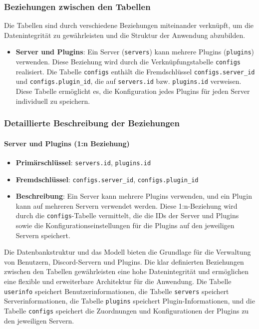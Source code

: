 \subsubsection{Beziehungen zwischen den Tabellen}\label{beziehungen-zwischen-den-tabellen}

Die Tabellen sind durch verschiedene Beziehungen miteinander verknüpft, um die Datenintegrität zu gewährleisten und die Struktur der Anwendung abzubilden.

\begin{itemize}
\item
  \textbf{Server und Plugins}: Ein Server (\texttt{servers}) kann mehrere Plugins (\texttt{plugins}) verwenden. Diese Beziehung wird durch die Verknüpfungstabelle \texttt{configs} realisiert. Die Tabelle \texttt{configs} enthält die Fremdschlüssel \texttt{configs.server\_id} und \texttt{configs.plugin\_id}, die auf \texttt{servers.id} bzw. \texttt{plugins.id} verweisen. Diese Tabelle ermöglicht es, die Konfiguration jedes Plugins für jeden Server individuell zu speichern.
\end{itemize}

\subsubsection{Detaillierte Beschreibung der Beziehungen}\label{detaillierte-beschreibung-der-beziehungen}

\paragraph{Server und Plugins (1:n Beziehung)}\label{server-und-plugins-1n-beziehung}

\begin{itemize}
\item
  \textbf{Primärschlüssel}: \texttt{servers.id}, \texttt{plugins.id}
\item
  \textbf{Fremdschlüssel}: \texttt{configs.server\_id}, \texttt{configs.plugin\_id}
\item
  \textbf{Beschreibung}: Ein Server kann mehrere Plugins verwenden, und ein Plugin kann auf mehreren Servern verwendet werden. Diese 1:n-Beziehung wird durch die \texttt{configs}-Tabelle vermittelt, die die IDs der Server und Plugins sowie die Konfigurationseinstellungen für die Plugins auf den jeweiligen Servern speichert.
\end{itemize}

Die Datenbankstruktur und das Modell bieten die Grundlage für die Verwaltung von Benutzern, Discord-Servern und Plugins. Die klar definierten Beziehungen zwischen den Tabellen gewährleisten eine hohe Datenintegrität und ermöglichen eine flexible und erweiterbare Architektur für die Anwendung. Die Tabelle \texttt{userinfo} speichert Benutzerinformationen, die Tabelle \texttt{servers} speichert Serverinformationen, die Tabelle \texttt{plugins} speichert Plugin-Informationen, und die Tabelle \texttt{configs} speichert die Zuordnungen und Konfigurationen der Plugins zu den jeweiligen Servern.


